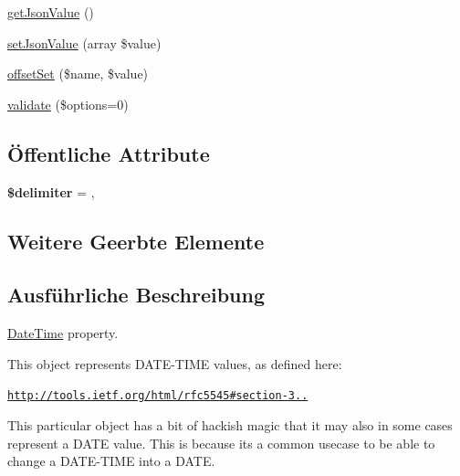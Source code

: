 \begin{DoxyCompactItemize}
\item 
\mbox{\hyperlink{class_sabre_1_1_v_object_1_1_property_1_1_i_calendar_1_1_date_time_a061adaeff86784b19d06802ac7000cdc}{get\+Json\+Value}} ()
\item 
\mbox{\hyperlink{class_sabre_1_1_v_object_1_1_property_1_1_i_calendar_1_1_date_time_abc17bf79c22124c8893f2669828c2655}{set\+Json\+Value}} (array \$value)
\item 
\mbox{\hyperlink{class_sabre_1_1_v_object_1_1_property_1_1_i_calendar_1_1_date_time_a4404e520add2797abc7744c0d0c842c6}{offset\+Set}} (\$name, \$value)
\item 
\mbox{\hyperlink{class_sabre_1_1_v_object_1_1_property_1_1_i_calendar_1_1_date_time_a5ce5db0cbea8aeb36405c64c8848e3e4}{validate}} (\$options=0)
\end{DoxyCompactItemize}
\subsection*{Öffentliche Attribute}
\begin{DoxyCompactItemize}
\item 
\mbox{\label{class_sabre_1_1_v_object_1_1_property_1_1_i_calendar_1_1_date_time_ab467944acf8811b2437e93d046a8cd42}} 
{\bfseries \$delimiter} = \textquotesingle{},\textquotesingle{}
\end{DoxyCompactItemize}
\subsection*{Weitere Geerbte Elemente}


\subsection{Ausführliche Beschreibung}
\mbox{\hyperlink{class_sabre_1_1_v_object_1_1_property_1_1_i_calendar_1_1_date_time}{Date\+Time}} property.

This object represents D\+A\+T\+E-\/\+T\+I\+ME values, as defined here\+:

\href{http://tools.ietf.org/html/rfc5545#section-3.3.4}{\tt http\+://tools.\+ietf.\+org/html/rfc5545\#section-\/3..}

This particular object has a bit of hackish magic that it may also in some cases represent a D\+A\+TE value. This is because it\textquotesingle{}s a common usecase to be able to change a D\+A\+T\+E-\/\+T\+I\+ME into a D\+A\+TE.

